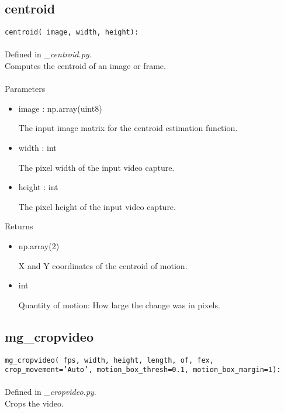 \documentclass[9pt]{extarticle}
\def\code#1{\texttt{#1}}
\begin{document}
\subsection{centroid}

\code{centroid(
    image, 
    width, 
    height):}
\\\\
Defined in \textit{\_centroid.py}.\\
Computes the centroid of an image or frame.
\\\\
\noindent Parameters
\begin{itemize}
\item image : np.array(uint8)

The input image matrix for the centroid estimation function. 

\item width : int

The pixel width of the input video capture. 

\item height : int

The pixel height of the input video capture. 
\end{itemize}

\noindent Returns
\begin{itemize}
\item np.array(2)

X and Y coordinates of the centroid of motion.

\item int

Quantity of motion: How large the change was in pixels.
\end{itemize}


\subsection{mg\_cropvideo}

\code{mg\_cropvideo(
    fps,
    width,
    height,
    length,
    of,
    fex,
    crop\_movement='Auto',
    motion\_box\_thresh=0.1,
    motion\_box\_margin=1):}
\\\\
Defined in \textit{\_cropvideo.py}.\\
Crops the video.
\\\\
\end{document}
